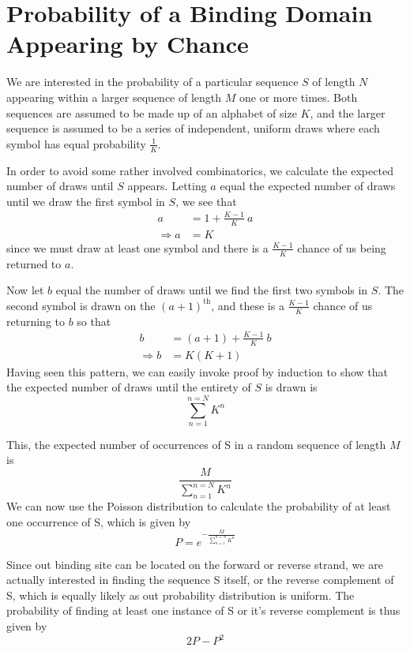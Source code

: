 
\chapter{Probability of a Binding Domain Appearing by Chance} %

\label{AppendixA} %


We are interested in the probability of a particular sequence $S$ of length $N$
appearing within a larger sequence of length $M$ one or more times.
Both sequences are assumed to be made up of an alphabet of size $K$, and the
larger sequence is assumed to be a series of independent, uniform draws where
each symbol has equal probability $\frac{1}{K}$.

In order to avoid some rather involved combinatorics, we calculate the expected
number of draws until $S$ appears.
Letting $a$ equal the expected number of draws until we draw the first symbol
in $S$, we see that
\begin{align*}
  a &= 1 + \frac{K-1}{K}~a \\
  \Rightarrow a &= K
\end{align*}
since we must draw at least one symbol and there is a $\frac{K-1}{K}$ chance of
us being returned to $a$.

Now let $b$ equal the number of draws until we find the first two symbols in
$S$.
The second symbol is drawn on the $(a+1)^{\mathrm{th}}$, and these is a
$\frac{K-1}{K}$ chance of us returning to $b$ so that
\begin{align*}
  b &= (a+1) + \frac{K-1}{K}~b \\
  \Rightarrow b &= K (K+1)
\end{align*}
Having seen this pattern, we can easily invoke proof by induction to show that
the expected number of draws until the entirety of $S$ is drawn is
\begin{equation*}
  \sum_{n=1}^{n=N} K^n
\end{equation*}

This, the expected number of occurrences of S in a random sequence of length $M$
is
\begin{equation*}
  \frac{M}{\sum_{n=1}^{n=N} K^n}
\end{equation*}
We can now use the Poisson distribution to calculate the probability of at
least one occurrence of S, which is given by
\begin{equation*}
  P = e^{-\frac{M}{\sum_{n=1}^{n=N} K^n}}
\end{equation*}

Since out binding site can be located on the forward or reverse strand, we are
actually interested in finding the sequence S itself, or the reverse complement
of S, which is equally likely as out probability distribution is uniform.
The probability of finding at least one instance of S or it's reverse
complement is thus given by
\begin{equation*}
  2P - P^2
\end{equation*}

